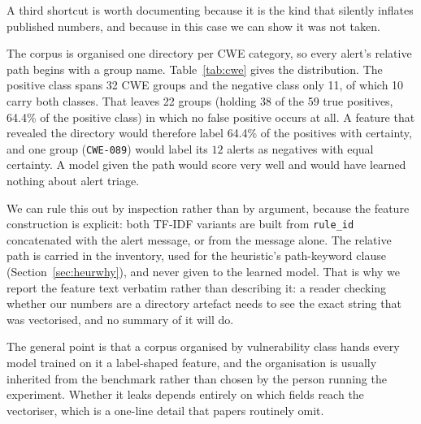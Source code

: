 \documentclass[journal]{IEEEtran}
\theoremstyle{definition}
\newcommand{\RNtp}{59}
\newcommand{\DCweTp}{32}
\newcommand{\DCweFp}{11}
\newcommand{\DCweBoth}{10}
\newcommand{\DCweOnlyTp}{22}
\newcommand{\DTpOnOnly}{38}
\newcommand{\DTpOnOnlyPct}{64.4}
\begin{document}
A third shortcut is worth documenting because it is the kind that silently
inflates published numbers, and because in this case we can show it was not
taken.

The corpus is organised one directory per CWE category, so every alert's
relative path begins with a group name. Table~\ref{tab:cwe} gives the
distribution. The positive class spans \DCweTp{} CWE groups and the negative
class only \DCweFp{}, of which \DCweBoth{} carry both classes. That leaves
\DCweOnlyTp{} groups (holding \DTpOnOnly{} of the \RNtp{} true positives,
\DTpOnOnlyPct\% of the positive class) in which no false positive occurs at
all. A feature that revealed the directory would therefore label
\DTpOnOnlyPct\% of the positives with certainty, and one group
(\texttt{CWE-089}) would label its \(12\) alerts as negatives with equal
certainty. A model given the path would score very well and would have learned
nothing about alert triage.

We can rule this out by inspection rather than by argument, because the feature
construction is explicit: both TF-IDF variants are built from
\texttt{rule\_id} concatenated with the alert message, or from the message
alone. The relative path is carried in the inventory, used for the heuristic's
path-keyword clause (Section~\ref{sec:heurwhy}), and never given to the
learned model. That is why we report the feature text verbatim rather than
describing it: a reader checking whether our numbers are a directory artefact
needs to see the exact string that was vectorised, and no summary of it will
do.

The general point is that a corpus organised by vulnerability class hands every
model trained on it a label-shaped feature, and the organisation is usually
inherited from the benchmark rather than chosen by the person running the
experiment. Whether it leaks depends entirely on which fields reach the
vectoriser, which is a one-line detail that papers routinely omit.
\end{document}
